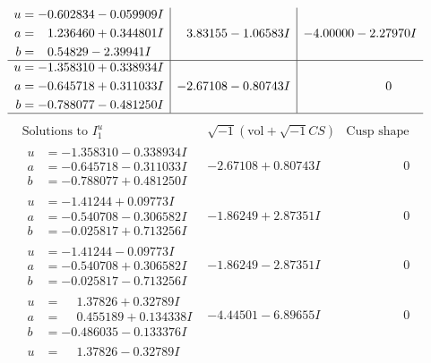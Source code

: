 \documentclass[1p]{elsarticle_modified}
\theoremstyle{definition}
\newcommand{\I}{\sqrt{-1}}
\begin{document}
$$\begin{array}{c|c|c}
\begin{aligned}
u &= -0.602834 - 0.059909 I \\
a &= \phantom{-}1.236460 + 0.344801 I \\
b &= \phantom{-}0.54829 - 2.39941 I\end{aligned}
 & \phantom{-}3.83155 - 1.06583 I & -4.00000 - 2.27970 I \\ \hline\begin{aligned}
u &= -1.358310 + 0.338934 I \\
a &= -0.645718 + 0.311033 I \\
b &= -0.788077 - 0.481250 I\end{aligned}
 & -2.67108 - 0.80743 I & \phantom{-0.000000 } 0\\
 \hline 
 \end{array}$$\newpage$$\begin{array}{c|c|c}  
\text{Solutions to }I^u_{1}& \I (\text{vol} + \sqrt{-1}CS) & \text{Cusp shape}\\
 \hline 
\begin{aligned}
u &= -1.358310 - 0.338934 I \\
a &= -0.645718 - 0.311033 I \\
b &= -0.788077 + 0.481250 I\end{aligned}
 & -2.67108 + 0.80743 I & \phantom{-0.000000 } 0 \\ \hline\begin{aligned}
u &= -1.41244 + 0.09773 I \\
a &= -0.540708 - 0.306582 I \\
b &= -0.025817 + 0.713256 I\end{aligned}
 & -1.86249 + 2.87351 I & \phantom{-0.000000 } 0 \\ \hline\begin{aligned}
u &= -1.41244 - 0.09773 I \\
a &= -0.540708 + 0.306582 I \\
b &= -0.025817 - 0.713256 I\end{aligned}
 & -1.86249 - 2.87351 I & \phantom{-0.000000 } 0 \\ \hline\begin{aligned}
u &= \phantom{-}1.37826 + 0.32789 I \\
a &= \phantom{-}0.455189 + 0.134338 I \\
b &= -0.486035 - 0.133376 I\end{aligned}
 & -4.44501 - 6.89655 I & \phantom{-0.000000 } 0 \\ \hline\begin{aligned}
u &= \phantom{-}1.37826 - 0.32789 I \\

\end{aligned}
\end{array}$$
\end{document}
